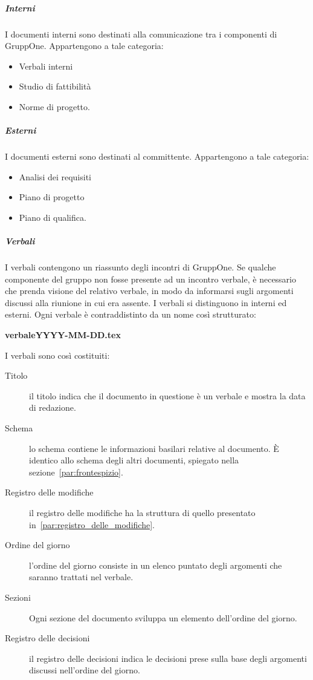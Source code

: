 \documentclass[../norme-di-progetto.tex]{subfiles}
\begin{document}
\subparagraph{Interni}%
\label{subp:suddivisione_dei_documenti/interni}
I documenti interni sono destinati alla comunicazione tra i componenti di GruppOne. Appartengono a tale categoria:

\begin{itemize}
  \item Verbali interni
  \item Studio di fattibilità
  \item Norme di progetto.
\end{itemize}

\subparagraph{Esterni}%
\label{subp:suddivisione_dei_documenti/esterni}
I documenti esterni sono destinati al committente. Appartengono a tale categoria:

\begin{itemize}
  \item Analisi dei requisiti
  \item Piano di progetto
  \item Piano di qualifica.
\end{itemize}

\subparagraph{Verbali}%
\label{subp:verbali}
I verbali contengono un riassunto degli incontri di GruppOne.
Se qualche componente del gruppo non fosse presente ad un incontro verbale, è necessario che prenda visione del relativo verbale, in modo da informarsi sugli argomenti discussi alla riunione in cui era assente.
I verbali si distinguono in interni ed esterni. Ogni verbale è contraddistinto da un nome così strutturato:
\begin{center}
  \textbf{verbaleYYYY-MM-DD.tex}
\end{center}
I verbali sono così costituiti:

\begin{description}
  \item [Titolo] il titolo indica che il documento in questione è un verbale e mostra la data di redazione.
  \item [Schema] lo schema contiene le informazioni basilari relative al documento. È identico allo schema degli altri documenti, spiegato nella sezione~\ref{par:frontespizio}.
  \item [Registro delle modifiche] il registro delle modifiche ha la struttura di quello presentato in~\ref{par:registro_delle_modifiche}.
  \item [Ordine del giorno] l'ordine del giorno consiste in un elenco puntato degli argomenti che saranno trattati nel verbale.
  \item [Sezioni] Ogni sezione del documento sviluppa un elemento dell'ordine del giorno.
  \item [Registro delle decisioni] il registro delle decisioni indica le decisioni prese sulla base degli argomenti discussi nell'ordine del giorno.
\end{description}
\end{document}
